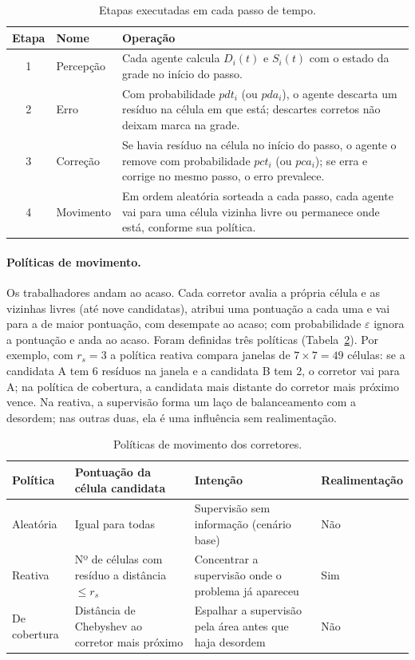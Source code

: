 \documentclass[11pt, a4paper]{article}
\begin{document}
\begin{table}[t]
\centering
\footnotesize
\caption{Etapas executadas em cada passo de tempo.}
\label{tab:ordem}
\begin{tabular}{@{}clp{8.2cm}@{}}
\toprule
Etapa & Nome & Operação \\
\midrule
1 & Percepção & Cada agente calcula $D_i(t)$ e $S_i(t)$ com o estado da grade no início do passo. \\
2 & Erro & Com probabilidade $pdt_i$ (ou $pda_i$), o agente descarta um resíduo na célula em que está; descartes corretos não deixam marca na grade. \\
3 & Correção & Se havia resíduo na célula no início do passo, o agente o remove com probabilidade $pct_i$ (ou $pca_i$); se erra e corrige no mesmo passo, o erro prevalece. \\
4 & Movimento & Em ordem aleatória sorteada a cada passo, cada agente vai para uma célula vizinha livre ou permanece onde está, conforme sua política. \\
\bottomrule
\end{tabular}
\end{table}

\paragraph{Políticas de movimento.}
Os trabalhadores andam ao acaso. Cada corretor avalia a própria célula e as vizinhas livres (até nove candidatas), atribui uma pontuação a cada uma e vai para a de maior pontuação, com desempate ao acaso; com probabilidade $\varepsilon$ ignora a pontuação e anda ao acaso. Foram definidas três políticas (Tabela~\ref{tab:politicas}).
Por exemplo, com $r_s=3$ a política reativa compara janelas de $7\times7=49$ células: se a candidata A tem 6 resíduos na janela e a candidata B tem 2, o corretor vai para A; na política de cobertura, a candidata mais distante do corretor mais próximo vence. Na reativa, a supervisão forma um laço de balanceamento com a desordem; nas outras duas, ela é uma influência sem realimentação.

\begin{table}[t]
\centering
\footnotesize
\caption{Políticas de movimento dos corretores.}
\label{tab:politicas}
\begin{tabular}{@{}lp{4.3cm}p{4.2cm}l@{}}
\toprule
Política & Pontuação da célula candidata & Intenção & Realimentação \\
\midrule
Aleatória & Igual para todas & Supervisão sem informação (cenário base) & Não \\
Reativa & Nº de células com resíduo a distância $\le r_s$ & Concentrar a supervisão onde o problema já apareceu & Sim \\
De cobertura & Distância de Chebyshev ao corretor mais próximo & Espalhar a supervisão pela área antes que haja desordem & Não \\
\bottomrule
\end{tabular}
\end{table}
\end{document}
